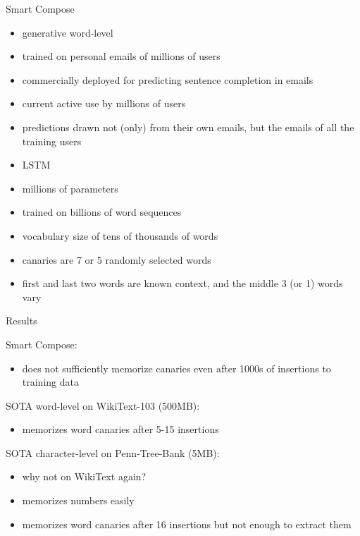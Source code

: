 \documentclass{beamer}
\begin{document}
\begin{frame}{Smart Compose}

\begin{itemize}
\item generative word-level
\item trained on personal emails of millions of users
\item commercially deployed for predicting sentence completion in emails
\item current active use by millions of users
\item predictions drawn not (only) from their own emails, but the emails of all the training users
\item LSTM
\item millions of parameters
\item trained on billions of word sequences 
\item vocabulary size of tens of thousands of words
\item canaries are 7 or 5 randomly selected words
\item first and last two words are known context, and the middle 3 (or 1) words vary
\end{itemize}

\end{frame}
\begin{frame}{Results}

Smart Compose:
\begin{itemize}
\item does not sufficiently memorize canaries even after 1000s of insertions to training data
\end{itemize}

\vfill

SOTA word-level on WikiText-103 (500MB):
\begin{itemize}
\item memorizes word canaries after  5-15 insertions
\end{itemize}

\vfill

SOTA character-level on Penn-Tree-Bank (5MB):
\begin{itemize}
\item why not on WikiText again?
\item memorizes numbers easily
\item memorizes word canaries after 16 insertions but not enough to extract them
\end{itemize}

\end{frame}
\end{document}
